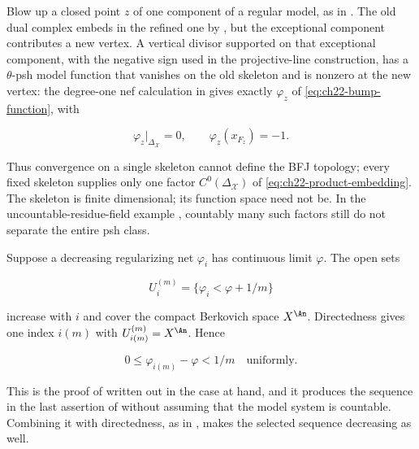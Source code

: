 \begin{example}
\label{ex:ch22-one-skeleton-insufficient}
Blow up a closed point $z$ of one component of a regular model, as in
.  The old dual complex embeds in the refined one by
, but the exceptional component contributes a
new vertex.  A vertical divisor supported on that exceptional component,
with the negative sign used in the projective-line construction, has a
$\theta$-psh model function that vanishes on the old skeleton and is
nonzero at the new vertex: the degree-one nef calculation in
 gives exactly
$\varphi_z$ of \eqref{eq:ch22-bump-function}, with

\[
 \varphi_z|_{\Delta_{\mathcal X}}=0,
 \qquad
 \varphi_z(x_{F_z})=-1 .
\]

Thus convergence on a single skeleton cannot define the BFJ topology; every
fixed skeleton supplies only one factor $C^0(\Delta_{\mathcal X})$ of
\eqref{eq:ch22-product-embedding}.  The skeleton is finite dimensional;
its function space need not be.  In the uncountable-residue-field example
, countably many such factors still do
not separate the entire psh class.
\end{example}

\begin{example}
\label{ex:ch22-dini-selection}
Suppose a decreasing regularizing net $\varphi_i$ has continuous limit
$\varphi$.  The open sets

\[
                     U_i^{(m)}=\{\varphi_i<\varphi+1/m\}
\]

increase with $i$ and cover the compact Berkovich space $X^{\An}$.
Directedness gives one index $i(m)$ with
$U_{i(m)}^{(m)}=X^{\An}$.  Hence

\[
             0\leq\varphi_{i(m)}-\varphi<1/m
             \quad\text{uniformly}.
\]

This is the proof of  written out in the case at hand,
and it produces the sequence in the last assertion of
 without assuming that the model
system is countable.  Combining it with directedness, as in
, makes the selected sequence
decreasing as well.
\end{example}

